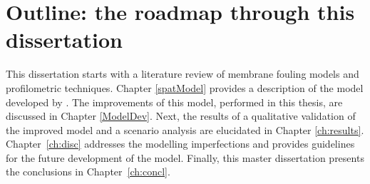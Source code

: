 \section{Outline: the roadmap through this dissertation}
This dissertation starts with a literature review of membrane fouling models and profilometric techniques. Chapter \ref{spatModel} provides a description of the model developed by \cite{Ghijs2014}. The improvements of this model, performed in this thesis, are discussed in Chapter \ref{ModelDev}. Next, the results of a qualitative validation of the improved model and a scenario analysis are elucidated in Chapter \ref{ch:results}. \mbox{Chapter \ref{ch:disc}} addresses the modelling imperfections and provides guidelines for the future development of the model. Finally, this master dissertation presents the conclusions in \mbox{Chapter \ref{ch:concl}}.
% 

\clearpage
\clearpage{\pagestyle{empty}\cleardoublepage}